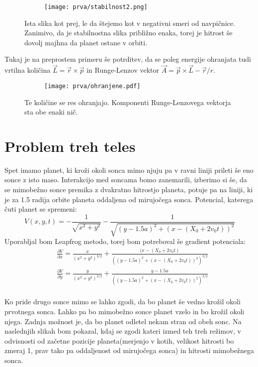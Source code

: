 \documentclass{article}
\begin{document}
\begin{figure}[H]
\centering
\begin{subfigure}{.7\textwidth}
\texttt{[image: prva/stabilnost2.png]}
\end{subfigure}
\caption*{Ista slika kot prej, le da štejemo kot v negativni smeri od navpičnice. Zanimivo, da je stabilnostna slika približno enaka, torej je hitrost še dovolj majhna da planet ostane v orbiti.}
\end{figure}

Tukaj je na preprostem primeru še potrditev, da se poleg energije ohranjata tudi vrtilna količina $\vec{L} = \vec{r} \times \vec{p}$ in Runge-Lenzov vektor 
$\vec{A} = \vec{p} \times \vec{L} - \vec{r}/r$.

\begin{figure}[H]
\centering
\begin{subfigure}{.7\textwidth}
\texttt{[image: prva/ohranjene.pdf]}
\end{subfigure}
\caption*{Te količine se res ohranjajo. Komponenti Runge-Lenzovega vektorja sta obe enaki nič.}
\end{figure}
\newpage
\section{Problem treh teles}

Spet imamo planet, ki kroži okoli sonca mimo njuju pa v ravni liniji prileti še eno sonce z isto maso. Interakcijo med soncama bomo zanemarili, izberimo si še, da se mimobežno sonce premika z dvakratno hitrostjo planeta, potuje pa na liniji, ki je za 1.5 radija orbite planeta oddaljena od mirujočega sonca.
Potencial, katerega čuti planet se spremeni:
\begin{equation*}
V(x,y,t) = -\frac{1}{\sqrt{x^2+y^2}} - \frac{1}{\sqrt{(y-1.5a)^2 +(x-(X_0 + 2v_0 t))^2}}
\end{equation*}
Uporabljal bom Leapfrog metodo, torej bom potreboval še gradient potenciala:
\begin{align*}
&\frac{\partial V}{\partial x} = \frac{x}{(x^2 + y^2)^{3/2}} + \frac{(x-(X_0 + 2v_0 t)}{((y-1.5a)^2 +(x-(X_0 + 2v_0 t))^2)^{3/2}}\\
&\frac{\partial V}{\partial y} = \frac{y}{(x^2 + y^2)^{3/2}} + \frac{y-1.5a}{((y-1.5a)^2 +(x-(X_0 + 2v_0 t))^2)^{3/2}}\\
\end{align*}

Ko pride drugo sonce mimo se lahko zgodi, da bo planet še vedno krožil okoli prvotnega sonca. Lahko pa bo mimobežno sonce planet vzelo in bo krožil okoli njega. Zadnja možnost je, da bo planet odletel nekam stran od obeh sonc. Na naslednjih slikah bom pokazal, kdaj se zgodi kateri izmed teh treh režimov, v odvisnosti od začetne pozicije planeta(merjenjo v kotih, velikost hitrosti bo zmeraj 1, prav tako pa oddaljenost od mirujočega sonca) in hitrosti mimobežnega sonca.
\end{document}
